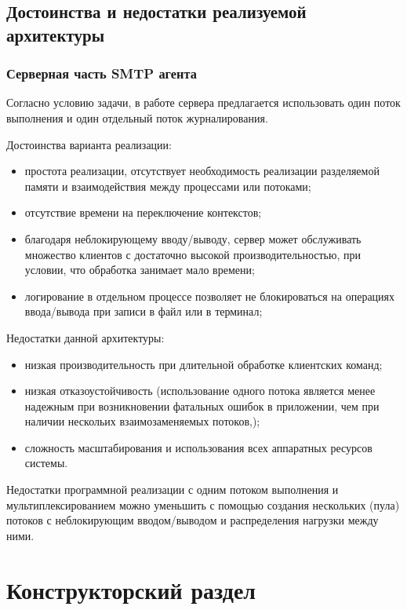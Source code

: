 \documentclass[a4paper,12pt]{report}
\begin{document}
\newpage

\section{Достоинства и недостатки реализуемой архитектуры}

\subsection{Серверная часть SMTP агента}

Согласно условию задачи, в работе сервера предлагается использовать один поток выполнения и один отдельный поток
журналирования.

Достоинства варианта реализации:
\begin{itemize}
    \item простота реализации, отсутствует необходимость реализации разделяемой памяти и взаимодействия между процессами или потоками;
    \item отсутствие времени на переключение контекстов;
    \item благодаря неблокирующему вводу/выводу, сервер может обслуживать множество клиентов с достаточно высокой производительностью, при условии, что обработка занимает мало времени;
    \item логирование в отдельном процессе позволяет не блокироваться на операциях ввода/вывода при записи в файл или в терминал;
\end{itemize}

Недостатки данной архитектуры:
\begin{itemize}
    \item низкая производительность при длительной обработке клиентских команд;
    \item низкая отказоустойчивость (использование одного потока является менее надежным при возникновении фатальных ошибок в приложении, чем при наличии нескольих взаимозаменяемых потоков,);
    \item сложность масштабирования и использования всех аппаратных ресурсов системы.
\end{itemize}

Недостатки программной реализации с одним потоком выполнения и мультиплексированием можно уменьшить с  помощью
создания нескольких (пула) потоков с неблокирующим вводом/выводом и распределения нагрузки между ними.


\chapter{Конструкторский раздел}
\end{document}
